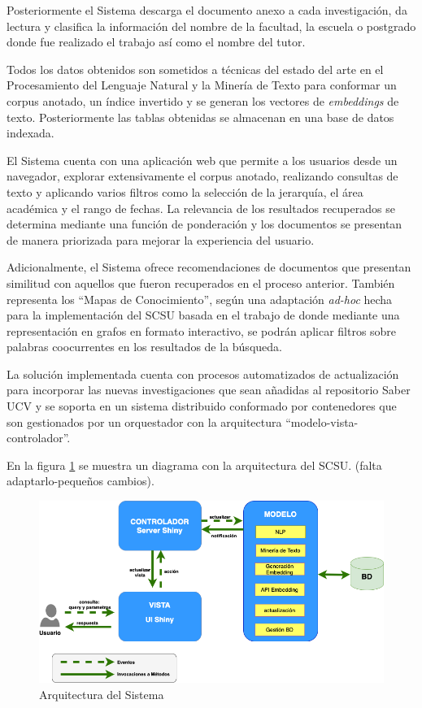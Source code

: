 \documentclass[
  12pt,
  openany]{book}
\begin{document}
Posteriormente el Sistema descarga el documento anexo a cada investigación, da lectura y clasifica la información del nombre de la facultad, la escuela o postgrado donde fue realizado el trabajo así como el nombre del tutor.

Todos los datos obtenidos son sometidos a técnicas del estado del arte en el Procesamiento del Lenguaje Natural y la Minería de Texto para conformar un corpus anotado, un índice invertido y se generan los vectores de \emph{embeddings} de texto. Posteriormente las tablas obtenidas se almacenan en una base de datos indexada.

El Sistema cuenta con una aplicación web que permite a los usuarios desde un navegador, explorar extensivamente el corpus anotado, realizando consultas de texto y aplicando varios filtros como la selección de la jerarquía, el área académica y el rango de fechas. La relevancia de los resultados recuperados se determina mediante una función de ponderación y los documentos se presentan de manera priorizada para mejorar la experiencia del usuario.

Adicionalmente, el Sistema ofrece recomendaciones de documentos que presentan similitud con aquellos que fueron recuperados en el proceso anterior. También representa los ``Mapas de Conocimiento'', según una adaptación \emph{ad-hoc} hecha para la implementación del SCSU basada en el trabajo de \citep{dueñas2011} donde mediante una representación en grafos en formato interactivo, se podrán aplicar filtros sobre palabras coocurrentes en los resultados de la búsqueda.

La solución implementada cuenta con procesos automatizados de actualización para incorporar las nuevas investigaciones que sean añadidas al repositorio Saber UCV y se soporta en un sistema distribuido conformado por contenedores que son gestionados por un orquestador con la arquitectura ``modelo-vista-controlador''.

En la figura \ref{fig:arquitecturasri} se muestra un diagrama con la arquitectura del SCSU. (falta adaptarlo-pequeños cambios).

\begin{figure}

{\centering \includegraphics[width=0.9\linewidth]{images/05-desarrollo/MVC9} 

}

\caption{Arquitectura del Sistema}\label{fig:arquitecturasri}
\end{figure}
\end{document}
